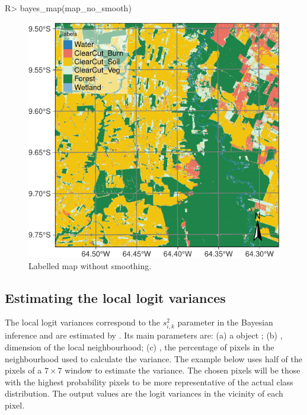 \documentclass[
  shortnames]{jss}
\begin{document}
\begin{CodeChunk}
\begin{CodeInput}
R> bayes_map(map_no_smooth)
\end{CodeInput}
\begin{figure}[h]

{\centering \includegraphics{Bayesian_smoothing_JSS_files/figure-latex/map1-1} 

}

\caption[Labelled map without smoothing]{Labelled map without smoothing.}\label{fig:map1}
\end{figure}
\end{CodeChunk}

\newpage

\hypertarget{estimating-the-local-logit-variances}{%
\subsection{Estimating the local logit variances}\label{estimating-the-local-logit-variances}}

The local logit variances correspond to the \(s^2_{i,k}\) parameter in the Bayesian inference and are estimated by . Its main parameters are: (a) a  object ; (b) , dimension of the local neighbourhood; (c) , the percentage of pixels in the neighbourhood used to calculate the variance. The example below uses half of the pixels of a \(7\times 7\) window to estimate the variance. The chosen pixels will be those with the highest probability pixels to be more representative of the actual class distribution. The output values are the logit variances in the vicinity of each pixel.
\end{document}
